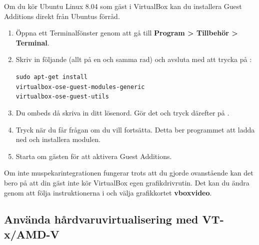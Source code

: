 \documentclass[a4paper,final]{memoir} %
\newcommand\xubuntuver{8.04}
\begin{document}
Om du kör Ubuntu Linux \xubuntuver{} som gäst i VirtualBox kan du installera Guest Additions direkt från Ubuntus förråd. 

\begin{enumerate}

\item Öppna ett Terminalfönster genom att gå till \textbf{Program \textgreater{} Tillbehör \textgreater{} Terminal}.

\item Skriv in följande (allt på en och samma rad) och avsluta med att trycka på :

\texttt{sudo apt-get install \\\hspace*{\baselineskip} virtualbox-ose-guest-modules-generic \\\hspace*{\baselineskip}  virtualbox-ose-guest-utils}

\item Du ombeds då skriva in ditt lösenord. Gör det och tryck därefter på . 

\item Tryck  när du får frågan om du vill fortsätta. Detta ber programmet  att ladda ned och installera modulen.

\item Starta om gästen för att aktivera Guest Additions.

\end{enumerate}

Om inte muspekarintegrationen fungerar trots att du gjorde ovanstående kan det bero på att din gäst inte kör VirtualBox egen grafikdrivrutin. Det kan du ändra genom att följa instruktionerna i  och välja grafikkortet \textbf{vboxvideo}.




\subsection{Använda hårdvaruvirtualisering med VT-x/AMD-V}
\end{document}
